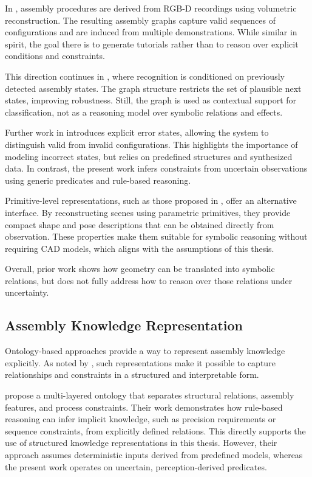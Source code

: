 \documentclass[11pt,titlepage,openright]{book}
\begin{document}
In \citet{Stanescu_2022}, assembly procedures are derived from RGB-D recordings using volumetric reconstruction. The resulting assembly graphs capture valid sequences of configurations and are induced from multiple demonstrations. While similar in spirit, the goal there is to generate tutorials rather than to reason over explicit conditions and constraints.

This direction continues in \citet{Stanescu_2023}, where recognition is conditioned on previously detected assembly states. The graph structure restricts the set of plausible next states, improving robustness. Still, the graph is used as contextual support for classification, not as a reasoning model over symbolic relations and effects.

Further work in \citet{Stanescu_2024} introduces explicit error states, allowing the system to distinguish valid from invalid configurations. This highlights the importance of modeling incorrect states, but relies on predefined structures and synthesized data. In contrast, the present work infers constraints from uncertain observations using generic predicates and rule-based reasoning.

Primitive-level representations, such as those proposed in \citet{Mazur_2024}, offer an alternative interface. By reconstructing scenes using parametric primitives, they provide compact shape and pose descriptions that can be obtained directly from observation. These properties make them suitable for symbolic reasoning without requiring CAD models, which aligns with the assumptions of this thesis.

Overall, prior work shows how geometry can be translated into symbolic relations, but does not fully address how to reason over those relations under uncertainty.


\subsection{Assembly Knowledge Representation}
\label{sec:knowledge-representation}

Ontology-based approaches provide a way to represent assembly knowledge explicitly. As noted by \citet{Zhong2020OntologyASP}, such representations make it possible to capture relationships and constraints in a structured and interpretable form.

\citet{Zhu_2022} propose a multi-layered ontology that separates structural relations, assembly features, and process constraints. Their work demonstrates how rule-based reasoning can infer implicit knowledge, such as precision requirements or sequence constraints, from explicitly defined relations. This directly supports the use of structured knowledge representations in this thesis. However, their approach assumes deterministic inputs derived from predefined models, whereas the present work operates on uncertain, perception-derived predicates.
\end{document}
